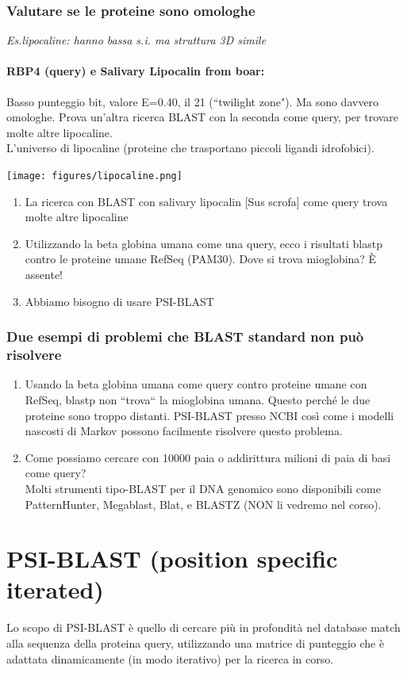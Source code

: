 \documentclass{article}
\begin{document}
\subsubsection{Valutare se le proteine sono omologhe}
\textit{Es.lipocaline: hanno bassa s.i. ma struttura 3D simile}\\
\paragraph{RBP4 (query) e Salivary Lipocalin from boar:} Basso punteggio bit, valore E=0.40, il 21%
(“twilight zone"). Ma sono davvero omologhe. Prova un'altra
ricerca BLAST con la seconda come query, per trovare
molte altre lipocaline.\\
L'universo di lipocaline (proteine che trasportano piccoli ligandi idrofobici).
\begin{center}
    \texttt{[image: figures/lipocaline.png]}
\end{center}
\begin{enumerate}
    \item La ricerca con BLAST con salivary lipocalin [Sus
    scrofa] come query trova molte altre lipocaline
    \item Utilizzando la beta globina umana come una query, ecco i risultati
    blastp contro le proteine umane RefSeq (PAM30). Dove si trova
    mioglobina? È assente!
    \item Abbiamo bisogno di usare PSI-BLAST
\end{enumerate}
\subsubsection{Due esempi di problemi che BLAST standard non può risolvere}
\begin{enumerate}
    \item Usando la beta globina umana come query
    contro proteine umane con RefSeq, blastp non
    “trova“ la mioglobina umana. Questo perché le due
    proteine sono troppo distanti. PSI-BLAST presso
    NCBI così come i modelli nascosti di Markov
    possono facilmente risolvere questo problema.
    \item Come possiamo cercare con 10000 paia o addirittura milioni di paia di basi come query?\\Molti strumenti tipo-BLAST per il DNA genomico sono
    disponibili come PatternHunter, Megablast, Blat, e
    BLASTZ (NON li vedremo nel corso).
\end{enumerate}
\section{PSI-BLAST (position specific iterated)}
Lo scopo di PSI-BLAST è quello di cercare
più in profondità nel database match alla
sequenza della proteina query, utilizzando
una matrice di punteggio che è adattata
dinamicamente (in modo iterativo) per la
ricerca in corso.
\end{document}
